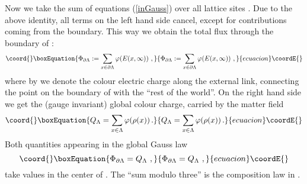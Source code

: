 \documentclass[a4paper,12pt]{article}
\begin{document}
Now we take the sum of equations (\ref{inGauss}) over all lattice
sites \coordHE{}. Due to the above identity, all terms on the
left hand side cancel, except for contributions coming from the
boundary. This way we obtain the total flux through the boundary
\myHighlight{$\partial \Lambda$}\coordHE{} of \myHighlight{$\Lambda$}\coordHE{}:
\begin{equation}\coord{}\boxEquation{\label{flux}
  \Phi_{\partial \Lambda} := \sum_{x \in \partial \Lambda}
  \varphi(E(x,\infty )) \ ,
}{\Phi_{\partial \Lambda} := \sum_{x \in \partial \Lambda}
  \varphi(E(x,\infty )) \ ,
}{ecuacion}\coordE{}\end{equation}
where by \coordHE{} we denote the colour electric charge along
the external link, connecting the point \coordHE{} on the boundary of
\myHighlight{$\Lambda$}\coordHE{} with the ``rest of the world''. On the right hand side
we get the (gauge invariant) global colour charge, carried by the
matter field
\begin{equation}\coord{}\boxEquation{
\label{globalM} Q_{\Lambda} = \sum_{x \in \Lambda}
\varphi(\rho(x)) \, .
}{
Q_{\Lambda} = \sum_{x \in \Lambda}
\varphi(\rho(x)) \, .
}{ecuacion}\coordE{}\end{equation}
Both quantities appearing in the global Gauss law
\begin{equation}\coord{}\boxEquation{\label{gG}
  \Phi_{\partial \Lambda} = Q_{\Lambda} \ ,
}{\Phi_{\partial \Lambda} = Q_{\Lambda} \ ,
}{ecuacion}\coordE{}\end{equation}
take values in the center \coordHE{} of \coordHE{}. The ``sum
modulo three'' is the composition law in \coordHE{}.
\end{document}
